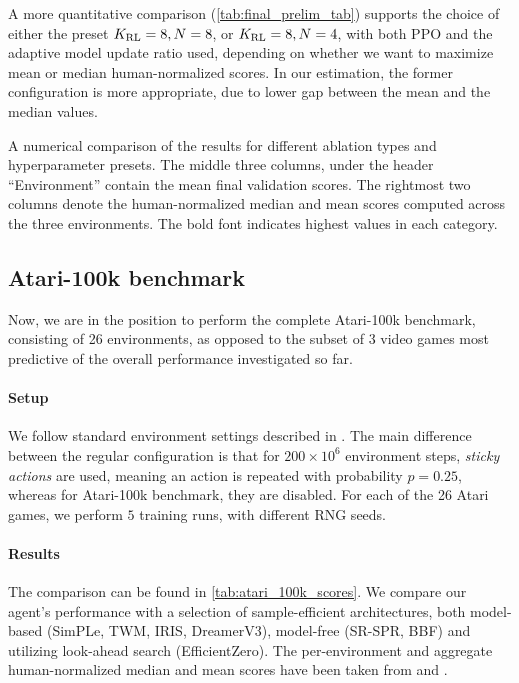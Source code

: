 \documentclass[en]{pracamgr}
\begin{document}
A more quantitative comparison (\autoref{tab:final_prelim_tab}) supports the choice of either the preset $K_{\rm RL} = 8, N = 8$, or $K_{\rm RL} = 8, N = 4$, with both PPO and the adaptive model update ratio used, depending on whether we want to maximize mean or median human-normalized scores. In our estimation, the former configuration is more appropriate, due to lower gap between the mean and the median values.

\begin{table}
  \centering
  \begin{adjustbox}{width=1.0\textwidth}
    }
  \end{adjustbox}
  \caption{A numerical comparison of the results for different ablation types and hyperparameter presets. The middle three columns, under the header ``Environment'' contain the mean final validation scores. The rightmost two columns denote the human-normalized median and mean scores computed across the three environments. The bold font indicates highest values in each category.}
  \label{tab:final_prelim_tab}
\end{table}

\subsection{Atari-100k benchmark}

Now, we are in the position to perform the complete Atari-100k benchmark, consisting of 26 environments, as opposed to the subset of 3 video games most predictive of the overall performance investigated so far.

\paragraph{Setup} We follow standard environment settings described in \autocite{kaiserModelBasedReinforcementLearning2024}. The main difference between the regular configuration is that for $200\times 10^6$ environment steps, \emph{sticky actions} are used, meaning an action is repeated with probability $p=0.25$, whereas for Atari-100k benchmark, they are disabled. For each of the 26 Atari games, we perform $5$ training runs, with different RNG seeds.

\paragraph{Results} The comparison  can be found in \autoref{tab:atari_100k_scores}. We compare our agent's performance with a selection of sample-efficient architectures, both model-based (SimPLe, TWM, IRIS, DreamerV3), model-free (SR-SPR, BBF) and utilizing look-ahead search (EfficientZero). The per-environment and aggregate human-normalized median and mean scores have been taken from \autocite{hafnerMasteringDiverseDomains2024} and \autocite{schwarzerBiggerBetterFaster2023}.
\end{document}
